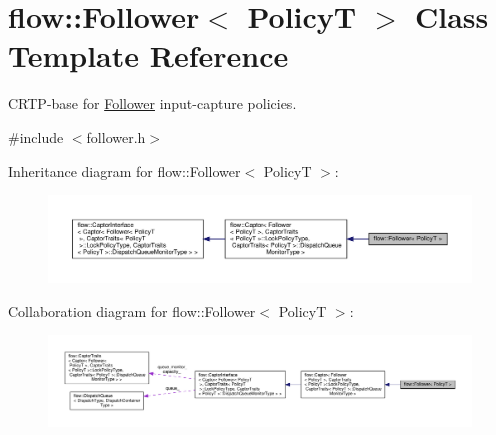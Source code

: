 \hypertarget{classflow_1_1_follower}{}\section{flow\+:\+:Follower$<$ PolicyT $>$ Class Template Reference}
\label{classflow_1_1_follower}


C\+R\+T\+P-\/base for \hyperlink{classflow_1_1_follower}{Follower} input-\/capture policies.  




{\ttfamily \#include $<$follower.\+h$>$}



Inheritance diagram for flow\+:\+:Follower$<$ PolicyT $>$\+:
\nopagebreak
\begin{figure}[H]
\begin{center}
\leavevmode
\includegraphics[width=350pt]{classflow_1_1_follower__inherit__graph}
\end{center}
\end{figure}


Collaboration diagram for flow\+:\+:Follower$<$ PolicyT $>$\+:
\nopagebreak
\begin{figure}[H]
\begin{center}
\leavevmode
\includegraphics[width=350pt]{classflow_1_1_follower__coll__graph}
\end{center}
\end{figure}
